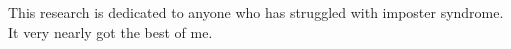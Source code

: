 This research is dedicated to anyone who has struggled with imposter syndrome. 
It very nearly got the best of me. 

